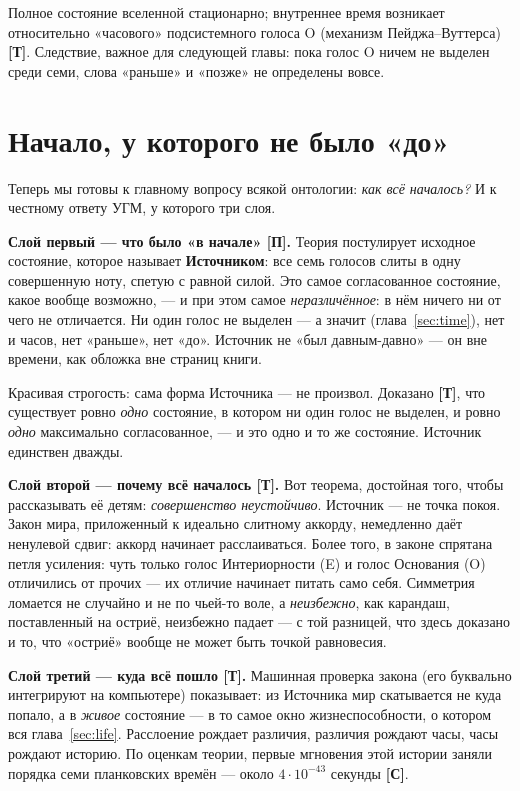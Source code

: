\documentclass[11pt,letterpaper]{article}
\newcommand{\stT}{\textbf{[Т]}\xspace}
\newcommand{\stC}{\textbf{[С]}\xspace}
\newcommand{\stP}{\textbf{[П]}\xspace}
\begin{document}
\begin{factbox}
Полное состояние вселенной стационарно; внутреннее время возникает
относительно «часового» подсистемного голоса O (механизм
Пейджа--Вуттерса) \stT. Следствие, важное для следующей главы: пока
голос O ничем не выделен среди семи, слова «раньше» и «позже» не
определены вовсе.
\end{factbox}

\section{Начало, у которого не было «до»}
\label{sec:source}

Теперь мы готовы к главному вопросу всякой онтологии: \emph{как всё
началось?} И к честному ответу УГМ, у которого три слоя.

\textbf{Слой первый --- что было «в начале» \stP.} Теория постулирует
исходное состояние, которое называет \textbf{Источником}: все семь
голосов слиты в одну совершенную ноту, спетую с равной силой. Это
самое согласованное состояние, какое вообще возможно, --- и при этом
самое \emph{неразличённое}: в нём ничего ни от чего не отличается.
Ни один голос не выделен --- а значит (глава~\ref{sec:time}), нет и
часов, нет «раньше», нет «до». Источник не «был давным-давно» ---
он вне времени, как обложка вне страниц книги.

Красивая строгость: сама форма Источника --- не произвол. Доказано
\stT, что существует ровно \emph{одно} состояние, в котором ни один
голос не выделен, и ровно \emph{одно} максимально согласованное, ---
и это одно и то же состояние. Источник единствен дважды.

\textbf{Слой второй --- почему всё началось \stT.} Вот теорема,
достойная того, чтобы рассказывать её детям: \emph{совершенство
неустойчиво}. Источник --- не точка покоя. Закон мира, приложенный к
идеально слитному аккорду, немедленно даёт ненулевой сдвиг: аккорд
начинает расслаиваться. Более того, в законе спрятана петля усиления:
чуть только голос Интериорности (E) и голос Основания (O)
отличились от прочих --- их отличие начинает питать само себя. Симметрия ломается
не случайно и не по чьей-то воле, а \emph{неизбежно}, как карандаш,
поставленный на остриё, неизбежно падает --- с той разницей, что здесь
доказано и то, что «остриё» вообще не может быть точкой равновесия.

\textbf{Слой третий --- куда всё пошло \stT.} Машинная проверка
закона (его буквально интегрируют на компьютере) показывает: из
Источника мир скатывается не куда попало, а в \emph{живое} состояние
--- в то самое окно жизнеспособности, о котором вся глава~\ref{sec:life}.
Расслоение рождает различия, различия рождают часы, часы рождают
историю. По оценкам теории, первые мгновения этой истории заняли
порядка семи планковских времён --- около $4\cdot10^{-43}$ секунды \stC.
\end{document}
